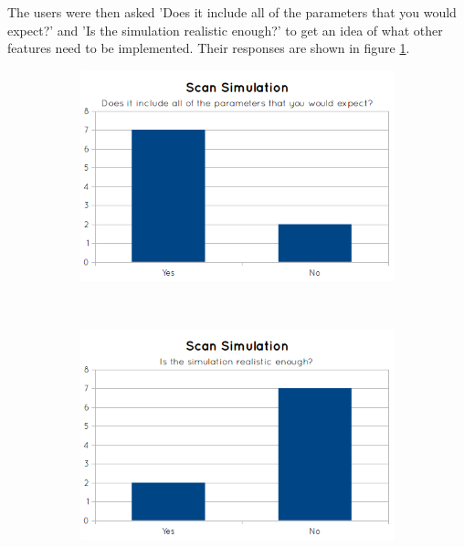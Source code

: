 The users were then asked 'Does it include all of the parameters that you would expect?' and 'Is the simulation realistic enough?' to get an idea of what other features need to be implemented. Their responses are shown in figure \ref{fig:graph_scan_simulation23}.

\begin{figure}[H]
  \centering
  \begin{subfigure}[b]{0.5\textwidth}
    \includegraphics[width=\textwidth]{images/evaluation/graph_scan_simulation_2.png}
  \end{subfigure}%
  ~ %
  \begin{subfigure}[b]{0.5\textwidth}
    \includegraphics[width=\textwidth]{images/evaluation/graph_scan_simulation_3.png}
  \end{subfigure}
  \caption{}\label{fig:graph_scan_simulation23}
\end{figure}

